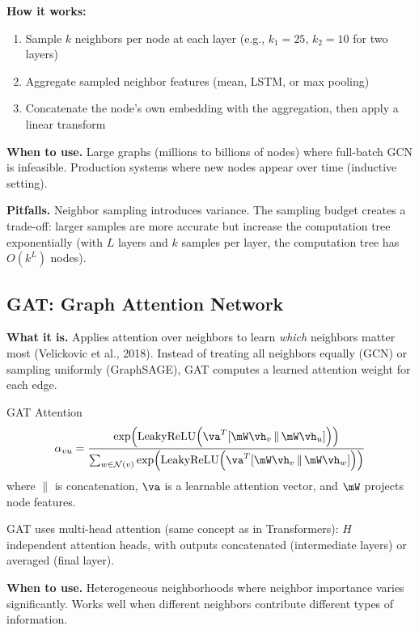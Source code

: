 \textbf{How it works:}
\begin{enumerate}
    \item Sample $k$ neighbors per node at each layer (e.g., $k_1 = 25$, $k_2 = 10$ for two layers)
    \item Aggregate sampled neighbor features (mean, LSTM, or max pooling)
    \item Concatenate the node's own embedding with the aggregation, then apply a linear transform
\end{enumerate}

\textbf{When to use.} Large graphs (millions to billions of nodes) where full-batch GCN is infeasible. Production systems where new nodes appear over time (inductive setting).

\textbf{Pitfalls.} Neighbor sampling introduces variance. The sampling budget creates a trade-off: larger samples are more accurate but increase the computation tree exponentially (with $L$ layers and $k$ samples per layer, the computation tree has $O(k^L)$ nodes).

\subsection{GAT: Graph Attention Network}

\textbf{What it is.} Applies attention over neighbors to learn \textit{which} neighbors matter most (Velickovic et al., 2018). Instead of treating all neighbors equally (GCN) or sampling uniformly (GraphSAGE), GAT computes a learned attention weight for each edge.

\begin{mathresult}{GAT Attention}
\begin{equation}
\alpha_{vu} = \frac{\exp\!\left(\text{LeakyReLU}\!\left(\va^T [\mW\vh_v \,\|\, \mW\vh_u]\right)\right)}{\sum_{w \in \mathcal{N}(v)} \exp\!\left(\text{LeakyReLU}\!\left(\va^T [\mW\vh_v \,\|\, \mW\vh_w]\right)\right)}
\label{eq:gat}
\end{equation}
where $\|$ is concatenation, $\va$ is a learnable attention vector, and $\mW$ projects node features.
\end{mathresult}

GAT uses multi-head attention (same concept as in Transformers): $H$ independent attention heads, with outputs concatenated (intermediate layers) or averaged (final layer).

\textbf{When to use.} Heterogeneous neighborhoods where neighbor importance varies significantly. Works well when different neighbors contribute different types of information.

